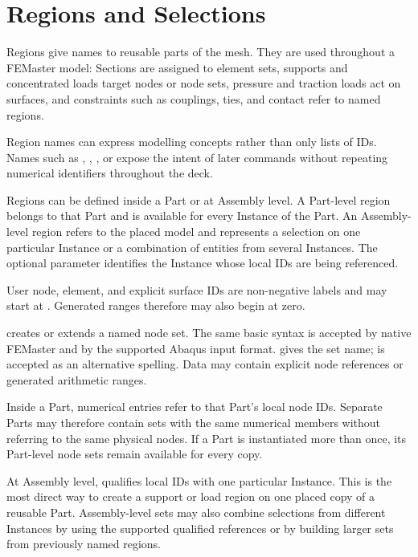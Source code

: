 \chapter{Regions and Selections}
\label{chap:regions}

Regions give names to reusable parts of the mesh. They are used throughout a FEMaster model: Sections are assigned to element sets, supports and concentrated loads target nodes or node sets, pressure and traction loads act on surfaces, and constraints such as couplings, ties, and contact refer to named regions.

Region names can express modelling concepts rather than only lists of IDs. Names such as , , , or  expose the intent of later commands without repeating numerical identifiers throughout the deck.

Regions can be defined inside a Part or at Assembly level. A Part-level region belongs to that Part and is available for every Instance of the Part. An Assembly-level region refers to the placed model and represents a selection on one particular Instance or a combination of entities from several Instances. The optional  parameter identifies the Instance whose local IDs are being referenced.

User node, element, and explicit surface IDs are non-negative labels and may start at . Generated ranges therefore may also begin at zero.


 creates or extends a named node set. The same basic syntax is accepted by native FEMaster and by the supported Abaqus input format.  gives the set name;  is accepted as an alternative spelling. Data may contain explicit node references or generated arithmetic ranges.

Inside a Part, numerical entries refer to that Part's local node IDs. Separate Parts may therefore contain sets with the same numerical members without referring to the same physical nodes. If a Part is instantiated more than once, its Part-level node sets remain available for every copy.

At Assembly level,  qualifies local IDs with one particular Instance. This is the most direct way to create a support or load region on one placed copy of a reusable Part. Assembly-level sets may also combine selections from different Instances by using the supported qualified references or by building larger sets from previously named regions.

